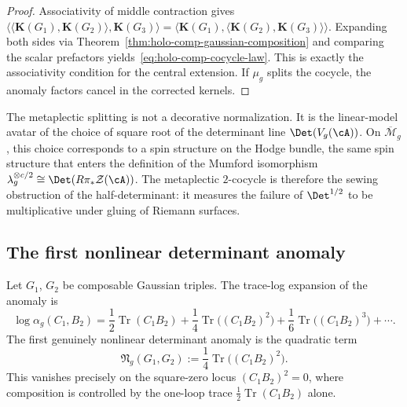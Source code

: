 \begin{proof}
Associativity of middle contraction gives
$\langle\langle \mathbf{K}(G_1), \mathbf{K}(G_2)\rangle,
\mathbf{K}(G_3)\rangle
= \langle \mathbf{K}(G_1),
\langle \mathbf{K}(G_2), \mathbf{K}(G_3)\rangle\rangle$.
Expanding both sides via
Theorem~\ref{thm:holo-comp-gaussian-composition} and comparing
the scalar prefactors yields~\eqref{eq:holo-comp-cocycle-law}.
This is exactly the associativity condition for the central
extension. If $\mu_g$ splits the cocycle, the anomaly factors
cancel in the corrected kernels.
\end{proof}

\begin{remark}
\label{rem:holo-comp-metaplectic-geometry}
The metaplectic splitting is not a decorative normalization. It is
the linear-model avatar of the choice of square root of the
determinant line $\Det(V_g(\cA))$. On $\overline{\mathcal{M}}_g$,
this choice corresponds to a spin structure on the Hodge bundle,
the same spin structure that enters the definition of the Mumford
isomorphism $\lambda_g^{\otimes c/2} \cong
\Det(R\pi_* \mathcal{Z}(\cA))$. The metaplectic $2$-cocycle is
therefore the sewing obstruction of the half-determinant: it
measures the failure of $\Det^{1/2}$ to be multiplicative under
gluing of Riemann surfaces.
\end{remark}

\subsection{The first nonlinear determinant anomaly}
\label{subsec:holo-comp-first-nonlinear-anomaly}

\begin{corollary}
\label{cor:holo-comp-first-nonlinear-anomaly}
Let $G_1$, $G_2$ be composable Gaussian triples. The trace-log
expansion of the anomaly is
\begin{equation}\label{eq:holo-comp-trace-log-anomaly}
\log \alpha_g(C_1, B_2)
=
\frac{1}{2}\operatorname{Tr}(C_1 B_2)
+ \frac{1}{4}\operatorname{Tr}\!\bigl((C_1 B_2)^2\bigr)
+ \frac{1}{6}\operatorname{Tr}\!\bigl((C_1 B_2)^3\bigr)
+ \cdots.
\end{equation}
The first genuinely nonlinear determinant anomaly is the quadratic
term
\begin{equation}\label{eq:holo-comp-first-nonlinear}
\mathfrak{N}_g(G_1, G_2)
:=
\frac{1}{4}\operatorname{Tr}\!\bigl((C_1 B_2)^2\bigr).
\end{equation}
This vanishes precisely on the square-zero locus $(C_1 B_2)^2 = 0$,
where composition is controlled by the one-loop trace
$\tfrac{1}{2}\operatorname{Tr}(C_1 B_2)$ alone.
\end{corollary}

